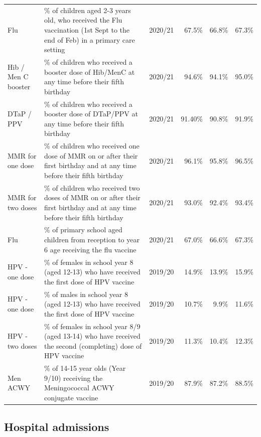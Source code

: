 \begin{table}[hbt]
\begin{tabular}{llrrrr}
    Flu & \% of children aged 2-3 years old, who received the Flu vaccination (1st Sept to the end of Feb) in a primary care setting & 2020/21 & 67.5\% & 66.8\% & 67.3\% \\
    Hib / Men C booster & \% of children who received a booster dose of Hib/MenC at any time before their fifth birthday & 2020/21 & 94.6\% & 94.1\% & 95.0\% \\
    DTaP / PPV & \% of children who received a booster dose of DTaP/PPV at any time before their fifth birthday & 2020/21 & 91.40\% & 90.8\% & 91.9\% \\
    MMR for one dose & \% of children who received one dose of MMR on or after their first birthday and at any time before their fifth birthday & 2020/21 & 96.1\% & 95.8\% & 96.5\% \\
    MMR for two doses & \% of children who received two doses of MMR on or after their first birthday and at any time before their fifth birthday &  2020/21 & 93.0\% & 92.4\% & 93.4\% \\
    Flu & \% of primary school aged children from reception to year 6 age receiving the flu vaccine & 2020/21 & 67.0\% & 66.6\% & 67.3\% \\
    HPV - one dose & \% of females in school year 8 (aged 12-13) who have received the first dose of HPV vaccine & 2019/20 & 14.9\% & 13.9\% & 15.9\% \\
    HPV - one dose & \% of males in school year 8 (aged 12-13) who have received the first dose of HPV vaccine & 2019/20 & 10.7\% & 9.9\% & 11.6\% \\
    HPV - two doses & \% of females in school year 8/9 (aged 13-14) who have received the second (completing) dose of HPV vaccine & 2019/20 & 11.3\% &10.4\% & 12.3\% \\
    Men ACWY & \% of 14-15 year olds (Year 9/10) receiving the Meningococcal ACWY conjugate vaccine & 2019/20 & 87.9\% & 87.2\% & 88.5\% \\
    \bottomrule
\end{tabular}
\label{tab:childhoodimms}
\end{table}
\normalsize
\newpage
\subsection{Hospital admissions}
